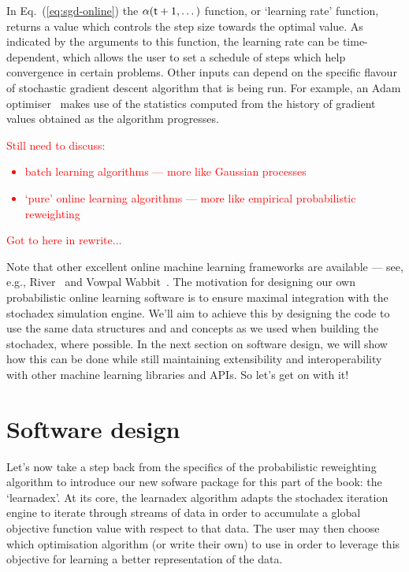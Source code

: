 In Eq.~(\ref{eq:sgd-online}) the $\alpha ({\sf t}+1,\dots )$ function, or `learning rate' function, returns a value which controls the step size towards the optimal value. As indicated by the arguments to this function, the learning rate can be time-dependent, which allows the user to set a schedule of steps which help convergence in certain problems. Other inputs can depend on the specific flavour of stochastic gradient descent algorithm that is being run. For example, an Adam optimiser~\cite{kingma2014adam} makes use of the statistics computed from the history of gradient values obtained as the algorithm progresses.

\textcolor{red}{Still need to discuss:
\begin{itemize}
\item{batch learning algorithms --- more like Gaussian processes}
\item{`pure' online learning algorithms --- more like empirical probabilistic reweighting}
\end{itemize}}

\textcolor{red}{Got to here in rewrite...}

Note that other excellent online machine learning frameworks are available --- see, e.g., River~\cite{river} and Vowpal Wabbit~\cite{vowpalwabbit}. The motivation for designing our own probabilistic online learning software is to ensure maximal integration with the stochadex simulation engine. We'll aim to achieve this by designing the code to use the same data structures and and concepts as we used when building the stochadex, where possible. In the next section on software design, we will show how this can be done while still maintaining extensibility and interoperability with other machine learning libraries and APIs. So let's get on with it!

\section{\sffamily Software design}

Let's now take a step back from the specifics of the probabilistic reweighting algorithm to introduce our new sofware package for this part of the book: the `learnadex'. At its core, the learnadex algorithm adapts the stochadex iteration engine to iterate through streams of data in order to accumulate a global objective function value with respect to that data. The user may then choose which optimisation algorithm (or write their own) to use in order to leverage this objective for learning a better representation of the data. 

